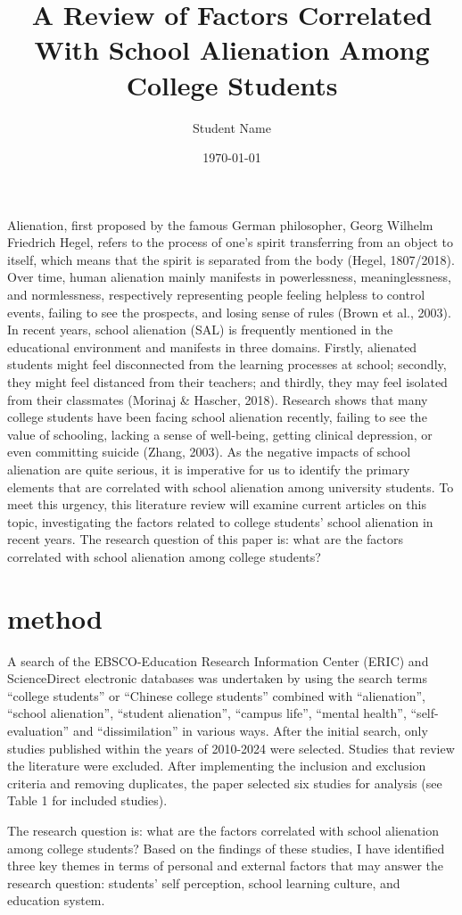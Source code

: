 \documentclass{scupi_apa_thesis}
\title{A Review of Factors Correlated With School Alienation Among College Students}
\author{Student Name}
\institute{Sichuan University-Pittsburgh Institute}
\date{\today}
\begin{document}
\maketitle
\par
Alienation, first proposed by the famous German philosopher, Georg Wilhelm Friedrich 
Hegel, refers to the process of one’s spirit transferring from an object to itself, which means that 
the spirit is separated from the body (Hegel, 1807/2018). Over time, human alienation mainly 
manifests in powerlessness, meaninglessness, and normlessness, respectively representing people 
feeling helpless to control events, failing to see the prospects, and losing sense of rules (Brown et 
al., 2003). In recent years, school alienation (SAL) is frequently mentioned in the educational 
environment and manifests in three domains. Firstly, alienated students might feel disconnected 
from the learning processes at school; secondly, they might feel distanced from their teachers; 
and thirdly, they may feel isolated from their classmates (Morinaj \& Hascher, 2018). Research 
shows that many college students have been facing school alienation recently, failing to see the 
value of schooling, lacking a sense of well-being, getting clinical depression, or even committing 
suicide (Zhang, 2003). As the negative impacts of school alienation are quite serious, it is 
imperative for us to identify the primary elements that are correlated with school alienation 
among university students. To meet this urgency, this literature review will examine current 
articles on this topic, investigating the factors related to college students’ school alienation in 
recent years. The research question of this paper is: what are the factors correlated with school 
alienation among college students? 
\section{method}
A search of the EBSCO-Education Research Information Center (ERIC) and 
ScienceDirect electronic databases was undertaken by using the search terms “college students” 
or “Chinese college students” combined with “alienation”, “school alienation”, “student 
alienation”, “campus life”, “mental health”, “self-evaluation” and “dissimilation” in various 
ways. After the initial search, only studies published within the years of 2010-2024 were 
selected. Studies that review the literature were excluded. After implementing the inclusion and 
exclusion criteria and removing duplicates, the paper selected six studies for analysis (see Table 
1 for included studies).
\par
The research question is: what are the factors correlated with school alienation among 
college students? Based on the findings of these studies, I have identified three key themes in 
terms of personal and external factors that may answer the research question: students’ self
perception, school learning culture, and education system.
\end{document}
